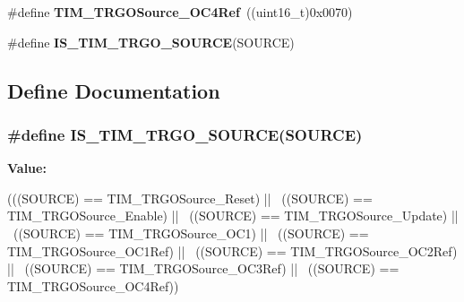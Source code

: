 \begin{DoxyCompactItemize}
\item 
\hypertarget{group__TIM__Trigger__Output__Source_gafc81561599199912d613c65f760919bc}{
\#define {\bfseries TIM\_\-TRGOSource\_\-OC4Ref}~((uint16\_\-t)0x0070)}
\label{group__TIM__Trigger__Output__Source_gafc81561599199912d613c65f760919bc}

\item 
\#define {\bfseries IS\_\-TIM\_\-TRGO\_\-SOURCE}(SOURCE)
\end{DoxyCompactItemize}


\subsection{Define Documentation}
\hypertarget{group__TIM__Trigger__Output__Source_gadf4e4e0422bd9c108b184884781d2d46}{
\subsubsection[{IS\_\-TIM\_\-TRGO\_\-SOURCE}]{\setlength{\rightskip}{0pt plus 5cm}\#define IS\_\-TIM\_\-TRGO\_\-SOURCE(SOURCE)}}
\label{group__TIM__Trigger__Output__Source_gadf4e4e0422bd9c108b184884781d2d46}
{\bfseries Value:}
\begin{DoxyCode}
(((SOURCE) == TIM_TRGOSource_Reset) || \
                                    ((SOURCE) == TIM_TRGOSource_Enable) || \
                                    ((SOURCE) == TIM_TRGOSource_Update) || \
                                    ((SOURCE) == TIM_TRGOSource_OC1) || \
                                    ((SOURCE) == TIM_TRGOSource_OC1Ref) || \
                                    ((SOURCE) == TIM_TRGOSource_OC2Ref) || \
                                    ((SOURCE) == TIM_TRGOSource_OC3Ref) || \
                                    ((SOURCE) == TIM_TRGOSource_OC4Ref))
\end{DoxyCode}
